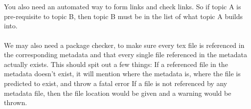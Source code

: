\documentclass[a4paper, 12pt]{report}
\begin{document}
\begin{center}
\\~\\You also need an automated way to form links and check links. So if topic A is pre-requisite to topic B, then topic B must be in the list of what topic A builds into.
\\~\\We may also need a package checker, to make sure every tex file is referenced in the corresponding metadata and that every single file referenced in the metadata actually exists.
This should spit out a few things: 
If a referenced file in the metadata doesn't exist, it will mention where the metadata is, where the file is predicted to exist, and throw a fatal error
If a file is not referenced by any metadata file, then the file location would be given and a warning would be thrown.

\end{center}
\end{document}

